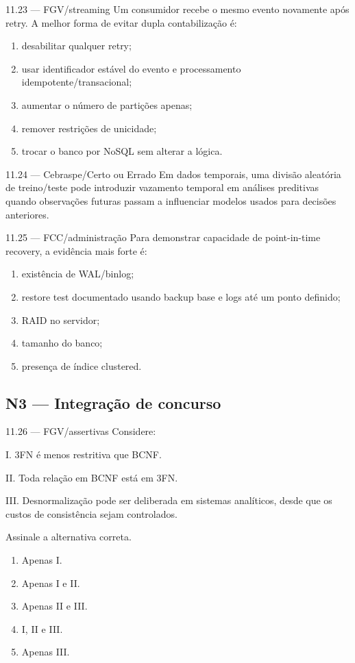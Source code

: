 \begin{questao}{ 11.23 — FGV/streaming}
Um consumidor recebe o mesmo evento novamente após retry. A melhor forma de evitar dupla contabilização é:
\begin{enumerate}[label=\Alph*)]
\item desabilitar qualquer retry;
\item usar identificador estável do evento e processamento idempotente/transacional;
\item aumentar o número de partições apenas;
\item remover restrições de unicidade;
\item trocar o banco por NoSQL sem alterar a lógica.
\end{enumerate}
\end{questao}

\begin{questao}{ 11.24 — Cebraspe/Certo ou Errado}
Em dados temporais, uma divisão aleatória de treino/teste pode introduzir vazamento temporal em análises preditivas quando observações futuras passam a influenciar modelos usados para decisões anteriores.
\end{questao}

\begin{questao}{ 11.25 — FCC/administração}
Para demonstrar capacidade de point-in-time recovery, a evidência mais forte é:
\begin{enumerate}[label=\Alph*)]
\item existência de WAL/binlog;
\item restore test documentado usando backup base e logs até um ponto definido;
\item RAID no servidor;
\item tamanho do banco;
\item presença de índice clustered.
\end{enumerate}
\end{questao}

\subsection*{N3 — Integração de concurso}

\begin{questao}{ 11.26 — FGV/assertivas}
Considere:

I. 3FN é menos restritiva que BCNF.

II. Toda relação em BCNF está em 3FN.

III. Desnormalização pode ser deliberada em sistemas analíticos, desde que os custos de consistência sejam controlados.

Assinale a alternativa correta.
\begin{enumerate}[label=\Alph*)]
\item Apenas I.
\item Apenas I e II.
\item Apenas II e III.
\item I, II e III.
\item Apenas III.
\end{enumerate}
\end{questao}

